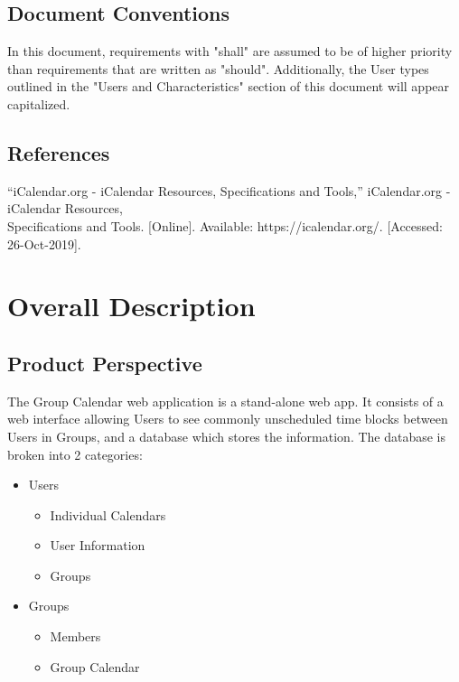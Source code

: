 \documentclass{scrreprt}
\begin{document}
\section{Document Conventions}
In this document, requirements with "shall" are assumed to be of higher priority than
requirements that are written as "should". Additionally, the User types outlined in 
the "Users and Characteristics" section of this document will appear capitalized.


\section{References}
“iCalendar.org - iCalendar Resources, Specifications and Tools,” iCalendar.org - iCalendar Resources,\\ Specifications and Tools. [Online]. Available: https://icalendar.org/. [Accessed: 26-Oct-2019].


\chapter{Overall Description}

\section{Product Perspective}
The Group Calendar web application is a stand-alone web app. It consists of a
web interface allowing Users to see commonly unscheduled time blocks between
Users in Groups, and a database which stores the information. The database is
broken into 2 categories:
\begin{itemize}
\item Users
	\begin{itemize}
	\item Individual Calendars
	\item User Information
	\item Groups
	\end{itemize}
\item Groups
	\begin{itemize}
	\item Members
	\item Group Calendar
	\end{itemize}
\end{itemize}
\end{document}
